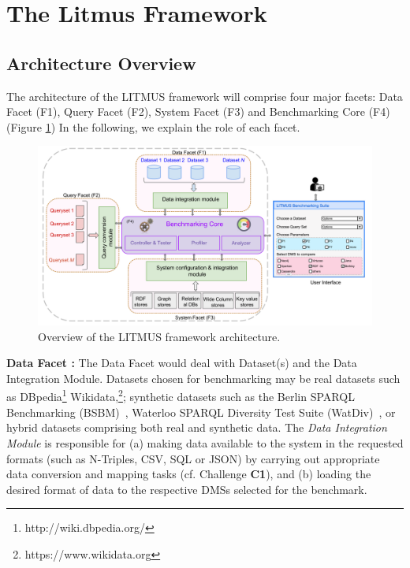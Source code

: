 \documentclass{llncs}
\begin{document}
\section{The Litmus Framework}\label{litmus_framework}
      \subsection{Architecture Overview}
        The architecture of the LITMUS framework will comprise four major facets: Data Facet (F1), Query Facet (F2), System Facet (F3) and Benchmarking Core (F4) (Figure \ref{fig:benchmark_arch})
        In the following, we explain the role of each facet.
         
        \begin{figure}[h]
            \centering
            \includegraphics[scale=0.14]{images/architecture.png}
            \caption{Overview of the LITMUS framework architecture.}
            \label{fig:benchmark_arch}
        \end{figure}
        
        \textbf{Data Facet :} The Data Facet would deal with Dataset(s) and the Data Integration Module.
        Datasets chosen for benchmarking may be real datasets such as DBpedia\footnote{http://wiki.dbpedia.org/} Wikidata,\footnote{https://www.wikidata.org}; synthetic datasets such as the Berlin SPARQL Benchmarking (BSBM)~\cite{Bizer2009TheBS}, Waterloo SPARQL Diversity Test Suite (WatDiv)~\cite{alucc2014diversified}, or hybrid datasets comprising both real and synthetic data. 
        The \textit{Data Integration Module} is responsible for (a) making data available to the system in the requested formats (such as N-Triples, CSV, SQL or JSON) by carrying out appropriate data conversion and mapping tasks (cf. Challenge \textbf{C1}), and (b) loading the desired format of data to the respective DMSs selected for the benchmark. 
        
\end{document}
